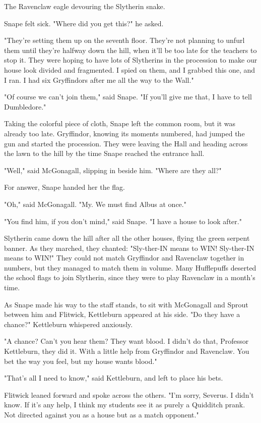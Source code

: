 The Ravenclaw eagle devouring the Slytherin snake.

Snape felt sick. "Where did you get this?" he asked.

"They're setting them up on the seventh floor. They're not planning to unfurl them until they're halfway down the hill, when it'll be too late for the teachers to stop it. They were hoping to have lots of Slytherins in the procession to make our house look divided and fragmented. I spied on them, and I grabbed this one, and I ran. I had six Gryffindors after me all the way to the Wall."

"Of course we can't join them," said Snape. "If you'll give me that, I have to tell Dumbledore."

Taking the colorful piece of cloth, Snape left the common room, but it was already too late. Gryffindor, knowing its moments numbered, had jumped the gun and started the procession. They were leaving the Hall and heading across the lawn to the hill by the time Snape reached the entrance hall.

"Well," said McGonagall, slipping in beside him. "Where are they all?"

For answer, Snape handed her the flag.

"Oh," said McGonagall. "My. We must find Albus at once."

"You find him, if you don't mind," said Snape. "I have a house to look after."

Slytherin came down the hill after all the other houses, flying the green serpent banner. As they marched, they chanted: "Sly-ther-IN means to WIN! Sly-ther-IN means to WIN!" They could not match Gryffindor and Ravenclaw together in numbers, but they managed to match them in volume. Many Hufflepuffs deserted the school flags to join Slytherin, since they were to play Ravenclaw in a month's time.

As Snape made his way to the staff stands, to sit with McGonagall and Sprout between him and Flitwick, Kettleburn appeared at his side. "Do they have a chance?" Kettleburn whispered anxiously.

"A chance? Can't you hear them? They want blood. I didn't do that, Professor Kettleburn, they did it. With a little help from Gryffindor and Ravenclaw. You bet the way you feel, but my house wants blood."

"That's all I need to know," said Kettleburn, and left to place his bets.

Flitwick leaned forward and spoke across the others. "I'm sorry, Severus. I didn't know. If it's any help, I think my students see it as purely a Quidditch prank. Not directed against you as a house but as a match opponent."

